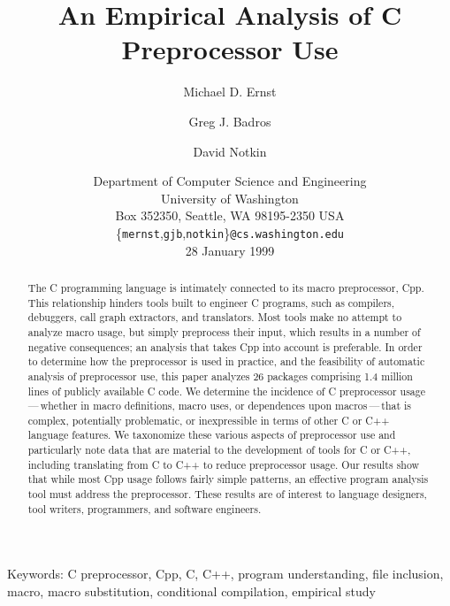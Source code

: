 \documentclass[10pt]{article}
\def\numpackages{26}
\def\numlinesalmost{1.4 million}
\begin{document}
% 


\title{An Empirical Analysis of C Preprocessor Use}

\author{Michael D. Ernst \and Greg J. Badros \and David Notkin}

\date{%
Department of Computer Science and Engineering \\
University of Washington \\
Box 352350, Seattle, WA  98195-2350  USA \\
{\small \{{\tt mernst},{\tt gjb},{\tt notkin}\}{\tt @cs.washington.edu}} \\
28 January 1999}  

\maketitle

\begin{abstract}
  The C programming language is intimately connected to its macro
  preprocessor, Cpp.  This relationship hinders tools built to engineer C
  programs, such as compilers, debuggers, call graph extractors, and
  translators.  Most tools make no attempt to analyze macro usage, but
  simply preprocess their input, which results in a number of negative
  consequences; an analysis that takes Cpp into account is preferable.  In
  order to determine how the preprocessor is used in practice, and the
  feasibility of automatic analysis of preprocessor use, this paper
  analyzes {\numpackages} packages comprising {\numlinesalmost} lines of publicly
  available C code.  We determine the incidence of C preprocessor
  usage\,---\,whether in macro definitions, macro uses, or dependences upon
  macros\,---\,that is complex, potentially problematic, or inexpressible
  in terms of other C or C++ language features.  We taxonomize these
  various aspects of preprocessor use and particularly note data that are
  material to the development of tools for C or C++, including translating
  from C to C++ to reduce preprocessor usage.  Our results show that while
  most Cpp usage follows fairly simple patterns, an effective program
  analysis tool must address the preprocessor.
  These results are of interest to language designers, tool writers,
  programmers, and software engineers.
\end{abstract}

\noindent
Keywords: C preprocessor, Cpp, C, C++, program understanding, file
inclusion, macro, macro substitution, conditional compilation, empirical study
\end{document}
